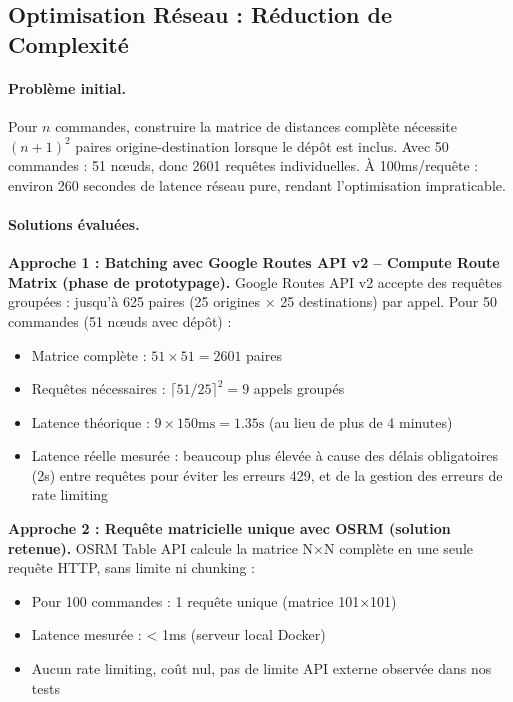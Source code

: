 \documentclass[12pt,a4paper]{report}
\begin{document}
\subsection{Optimisation Réseau : Réduction de Complexité}

\paragraph{Problème initial.}
Pour $n$ commandes, construire la matrice de distances complète nécessite $(n+1)^2$ paires origine-destination lorsque le dépôt est inclus. Avec 50 commandes : 51 nœuds, donc 2601 requêtes individuelles. À 100ms/requête : environ 260 secondes de latence réseau pure, rendant l'optimisation impraticable.

\paragraph{Solutions évaluées.}

\textbf{Approche 1 : Batching avec Google Routes API v2 -- Compute Route Matrix (phase de prototypage).}
Google Routes API v2 accepte des requêtes groupées : jusqu'à 625 paires (25 origines × 25 destinations) par appel. Pour 50 commandes (51 nœuds avec dépôt) :
\begin{itemize}[leftmargin=2.2em]
    \item Matrice complète : $51 \times 51 = 2601$ paires
    \item Requêtes nécessaires : $\lceil 51 / 25 \rceil^2 = 9$ appels groupés
    \item Latence théorique : $9 \times 150\text{ms} = 1.35\text{s}$ (au lieu de plus de 4 minutes)
    \item Latence réelle mesurée : beaucoup plus élevée à cause des délais obligatoires (2s) entre requêtes pour éviter les erreurs 429, et de la gestion des erreurs de rate limiting
\end{itemize}

\textbf{Approche 2 : Requête matricielle unique avec OSRM (solution retenue).}
OSRM Table API calcule la matrice N×N complète en une seule requête HTTP, sans limite ni chunking :
\begin{itemize}[leftmargin=2.2em]
    \item Pour 100 commandes : 1 requête unique (matrice 101×101)
    \item Latence mesurée : < 1ms (serveur local Docker)
    \item Aucun rate limiting, coût nul, pas de limite API externe observée dans nos tests
\end{itemize}
\end{document}
